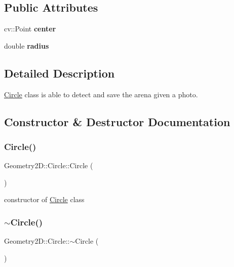 \subsection*{Public Attributes}
\begin{DoxyCompactItemize}
\item 
\mbox{\label{class_geometry2_d_1_1_circle_abdc47cda7bbabe42e10536a29952c2fa}} 
cv\+::\+Point {\bfseries center}
\item 
\mbox{\label{class_geometry2_d_1_1_circle_a9f62fa67d77dac2856f0b8971f13b7e6}} 
double {\bfseries radius}
\end{DoxyCompactItemize}


\subsection{Detailed Description}
\mbox{\hyperlink{class_geometry2_d_1_1_circle}{Circle}} class is able to detect and save the arena given a photo. 

\subsection{Constructor \& Destructor Documentation}
\mbox{\label{class_geometry2_d_1_1_circle_a8e740ff9413a9abac8f7c666b89c4366}} 
\subsubsection{\texorpdfstring{Circle()}{Circle()}}
{\footnotesize\ttfamily Geometry2\+D\+::\+Circle\+::\+Circle (\begin{DoxyParamCaption}{ }\end{DoxyParamCaption})}

constructor of \mbox{\hyperlink{class_geometry2_d_1_1_circle}{Circle}} class \mbox{\label{class_geometry2_d_1_1_circle_ae5bfc08e732dd97fc3cc4c485787be44}} 
\subsubsection{\texorpdfstring{$\sim$\+Circle()}{~Circle()}}
{\footnotesize\ttfamily Geometry2\+D\+::\+Circle\+::$\sim$\+Circle (\begin{DoxyParamCaption}{ }\end{DoxyParamCaption})}

